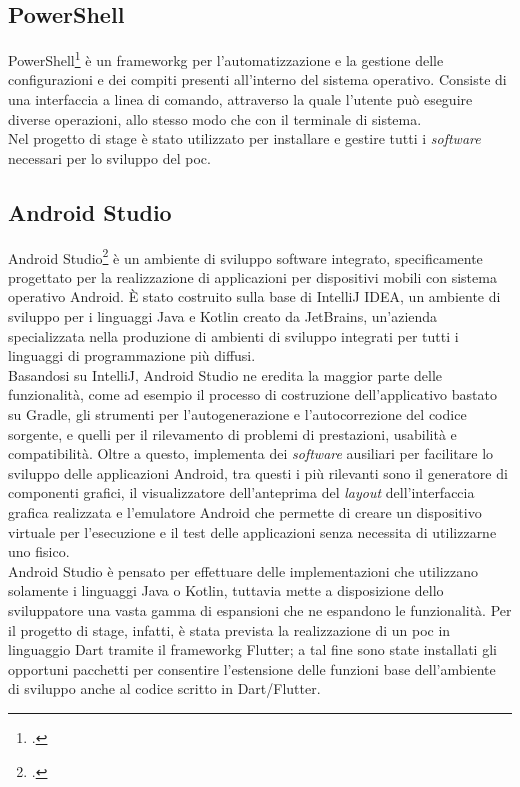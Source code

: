 \subsection{PowerShell}

PowerShell\footcite{site:powershell} è un \gls{frameworkg} per l'automatizzazione e la gestione delle configurazioni e dei compiti presenti all'interno del sistema operativo. Consiste di una interfaccia a linea di comando, attraverso la quale l'utente può eseguire diverse operazioni, allo stesso modo che con il terminale di sistema.\\
Nel progetto di stage è stato utilizzato per installare e gestire tutti i \textit{software} necessari per lo sviluppo del \gls{poc}.

\subsection{Android Studio}

Android Studio\footcite{site:android-studio} è un ambiente di sviluppo software integrato, specificamente progettato per la realizzazione di applicazioni per dispositivi mobili con sistema operativo Android. È stato costruito sulla base di IntelliJ IDEA, un ambiente di sviluppo per i linguaggi Java e Kotlin creato da JetBrains, un'azienda specializzata nella produzione di ambienti di sviluppo integrati per tutti i linguaggi di programmazione più diffusi.\\
Basandosi su IntelliJ, Android Studio ne eredita la maggior parte delle funzionalità, come ad esempio il processo di costruzione dell'applicativo bastato su Gradle, gli strumenti per l'autogenerazione e l'autocorrezione del codice sorgente, e quelli per il rilevamento di problemi di prestazioni, usabilità e compatibilità. Oltre a questo, implementa dei \textit{software} ausiliari per facilitare lo sviluppo delle applicazioni Android, tra questi i più rilevanti sono il generatore di componenti grafici, il visualizzatore dell'anteprima del \textit{layout} dell'interfaccia grafica realizzata e l'emulatore Android che permette di creare un dispositivo virtuale per l'esecuzione e il test delle applicazioni senza necessita di utilizzarne uno fisico.\\
Android Studio è pensato per effettuare delle implementazioni che utilizzano solamente i linguaggi Java o Kotlin, tuttavia mette a disposizione dello sviluppatore una vasta gamma di espansioni che ne espandono le funzionalità. Per il progetto di stage, infatti, è stata prevista la realizzazione di un \gls{poc} in linguaggio Dart tramite il \gls{frameworkg} Flutter; a tal fine sono state installati gli opportuni pacchetti per consentire l'estensione delle funzioni base dell'ambiente di sviluppo anche al codice scritto in Dart/Flutter.

